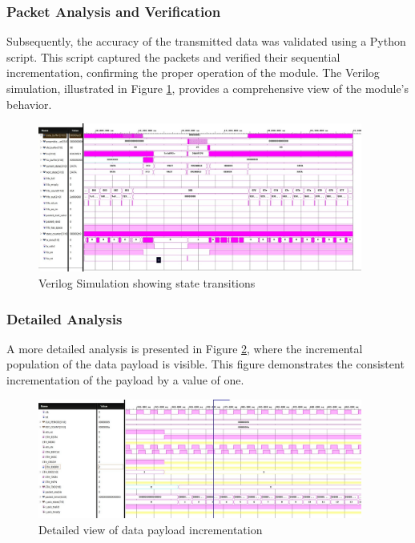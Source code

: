 \subsubsection{Packet Analysis and Verification}
Subsequently, the accuracy of the transmitted data was validated using a Python script. This script captured the packets and verified their sequential incrementation, confirming the proper operation of the module. The Verilog simulation, illustrated in Figure \ref{fig:verilog_sim}, provides a comprehensive view of the module's behavior.

\begin{figure}[h]
    \centering
    \includegraphics[width=0.95\textwidth]{Sections/RESULTS/Images/verilog_simulation.png}
    \caption{Verilog Simulation showing state transitions}
    \label{fig:verilog_sim}
\end{figure}

\subsubsection{Detailed Analysis}
A more detailed analysis is presented in Figure \ref{fig:data_payload}, where the incremental population of the data payload is visible. This figure demonstrates the consistent incrementation of the payload by a value of one.

\begin{figure}[h]
    \centering
    \includegraphics[width=0.95\textwidth]{Sections/RESULTS/Images/data_payload.png}
    \caption{Detailed view of data payload incrementation}
    \label{fig:data_payload}
\end{figure}

